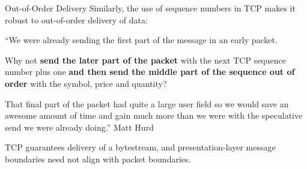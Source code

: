 \documentclass{beamer}
\begin{document}
\begin{frame}{Out-of-Order Delivery}
	Similarly, the use of sequence numbers in TCP makes it robust to out-of-order delivery of data:
	\begin{block}{}
		``We were already sending the first part of the message in an early packet.

		Why not \textbf{send the later part of the packet} with the next TCP sequence number plus one \textbf{and then send the middle part of the sequence out of order} with the symbol, price and quantity?

		That final part of the packet had quite a large user field so we would save an awesome amount of time and gain much more than we were with the speculative send we were already doing.'' Matt Hurd
	\end{block}

	TCP guarantees delivery of a bytestream, and presentation-layer message boundaries need not align with packet boundaries.%
\end{frame}
\end{document}
